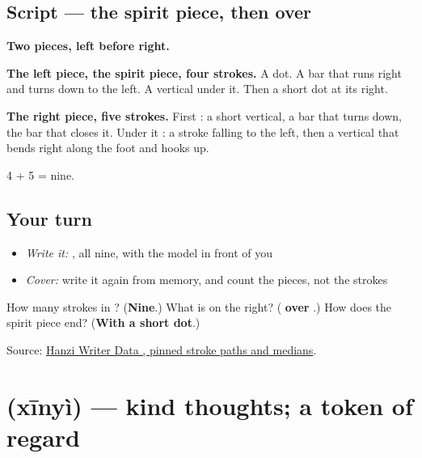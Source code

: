 \subsection*{Script — the spirit piece, then  over }

\begin{quote}
\end{quote}

\textbf{Two pieces, left before right.}

\textbf{The left piece, the spirit piece, four strokes.} A dot. A bar that runs right and turns down to the left. A vertical under it. Then a short dot at its right.

\textbf{The right piece, five strokes.} First : a short vertical, a bar that turns down, the bar that closes it. Under it : a stroke falling to the left, then a vertical that bends right along the foot and hooks up.

4 + 5 = nine.

\subsection*{Your turn}
\begin{itemize}
\raggedright
  \item \emph{Write it:} , all nine, with the model in front of you
  \item \emph{Cover:} write it again from memory, and count the pieces, not the strokes
\end{itemize}

\begin{tcolorbox}[breakable,colback=teal!4,colframe=teal!35!black,title={Before you move on}]
How many strokes in ? (\textbf{Nine}.) What is on the right? (\textbf{ over }.) How does the spirit piece end? (\textbf{With a short dot}.)

Source: \href{https://raw.githubusercontent.com/chanind/hanzi-writer-data/68d10a4b21150cae5e1ebbd223eed289cf32d90c/data/\%E7\%A5\%9D.json}{Hanzi Writer Data , pinned stroke paths and medians}.
\end{tcolorbox}
\section[\texorpdfstring{\zh{心意} (xīnyì)}{心意 (xīnyì)}]{ (xīnyì) — kind thoughts; a token of regard}

